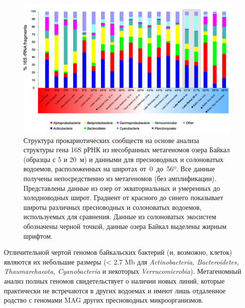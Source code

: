 \documentclass[a4paper,12pt,openany,final]{extreport}
\def\oldcaption{} \let\oldcaption=\caption
\def\caption{\stepcounter{captionsnum}\oldcaption}
\begin{document}
\begin{figure}\centering
  \includegraphics[width=\linewidth]{media/image8.png}
  \caption{Структура прокариотических сообществ на основе анализа структуры гена 16S рРНК из несобранных метагеномов озера Байкал (образцы с 5 и 20~м) и данными для пресноводных и солоноватых водоемов, расположенных на широтах от~0~до~56º. Все данные получены непосредственно из метагеномов (без амплификации). Представлены данные из озер от экваториальных и умеренных до холодноводных широт. Градиент от красного до синего показывает широты различных пресноводных и солоноватых водоемов, используемых для сравнения. Данные из солоноватых экосистем обозначены черной точкой, данные озера Байкал выделены жирным шрифтом.}\label{fig:4-3}
\end{figure}

Отличительной чертой геномов байкальских бактерий (и, возможно, клеток) являются их небольшие размеры (\textless{} 2.7 Mb для \emph{Actinobacteria, Bacteroidetes, Thaumarchaeota, Cyanobacteria} и некоторых \emph{Verrucomicrobia}). Метагеномный анализ полных геномов свидетельствует о наличии новых линий, которые практически не встречаются в других водоемах и имеют лишь отдаленное родство с геномами MAG других пресноводных микроорганизмов.
\end{document}
